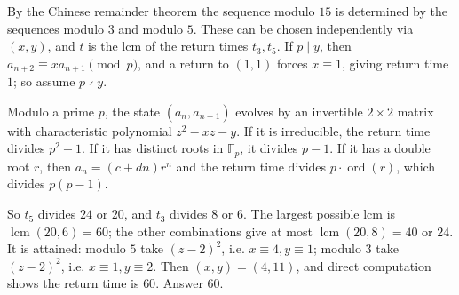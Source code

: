 By the Chinese remainder theorem the sequence modulo $15$ is determined by the sequences modulo $3$ and modulo $5$. These can be chosen independently via $(x,y)$, and $t$ is the lcm of the return times $t_3,t_5$. If $p\mid y$, then $a_{n+2}\equiv xa_{n+1}\pmod p$, and a return to $(1,1)$ forces $x\equiv1$, giving return time $1$; so assume $p\nmid y$.

Modulo a prime $p$, the state $(a_n,a_{n+1})$ evolves by an invertible $2\times2$ matrix with characteristic polynomial $z^2-xz-y$. If it is irreducible, the return time divides $p^2-1$. If it has distinct roots in $\mathbb F_p$, it divides $p-1$. If it has a double root $r$, then $a_n=(c+dn)r^n$ and the return time divides $p\cdot\operatorname{ord}(r)$, which divides $p(p-1)$.

So $t_5$ divides $24$ or $20$, and $t_3$ divides $8$ or $6$. The largest possible lcm is $\operatorname{lcm}(20,6)=60$; the other combinations give at most $\operatorname{lcm}(20,8)=40$ or $24$. It is attained: modulo $5$ take $(z-2)^2$, i.e. $x\equiv4,y\equiv1$; modulo $3$ take $(z-2)^2$, i.e. $x\equiv1,y\equiv2$. Then $(x,y)=(4,11)$, and direct computation shows the return time is $60$. Answer $\boxed{60}$.
